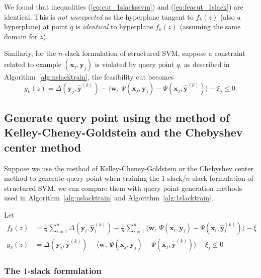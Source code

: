 {We found that inequalities (\ref{eq:cut_1slackssvm}) and (\ref{eq:feacut_1slack}) are identical.
This is \emph{not unexpected} as the hyperplane tangent to $f_k(z)$ (also a hyperplane) at point $q$ is \emph{identical} to hyperplane $f_k(z)$
(assuming the same domain for $z$). 

Similarly, for the $n$-slack formulation of structured SVM, 
suppose a constraint related to example $(\mathbf{x}_j, \mathbf{y}_j)$ is violated by query point $q$, 
as described in Algorithm~\ref{alg:nslacktrain}, the feasibility cut becomes
\begin{equation}
\label{eq:feacut_nslack}
g_k(z) = \Delta(\mathbf{y}_j, \hat{\mathbf{y}}^{(k)}) - 
\langle \mathbf{w},~ \Psi(\mathbf{x}_j, \mathbf{y}_j) - \Psi(\mathbf{x}_j, \hat{\mathbf{y}}^{(k)}) \rangle - \xi_j \le 0.
\end{equation}
}


\subsection{Generate query point using the method of Kelley-Cheney-Goldstein and the Chebyshev center method}
\label{sec:compare}

Suppose we use the method of Kelley-Cheney-Goldstein or the Chebyshev center method to generate query point 
when training the $1$-slack/$n$-slack formulation of structured SVM,
we can compare them with query point generation methods used in Algorithm~\ref{alg:nslacktrain} and Algorithm~\ref{alg:1slacktrain}.

Let 
\begin{align}
f_k(z) &= \frac{1}{n} \sum_{i=1}^n \Delta(\mathbf{y}_i, \hat{\mathbf{y}}_i^{(k)}) - 
          \frac{1}{n} \sum_{i=1}^n \langle \mathbf{w},~ \Psi(\mathbf{x}_i, \mathbf{y}_i) - \Psi(\mathbf{x}_i, \hat{\mathbf{y}}_i^{(k)}) \rangle - \xi
          \label{eq:constraint_k} \\
g_k(z) &= \Delta(\mathbf{y}_j, \hat{\mathbf{y}}^{(k)}) - 
          \langle \mathbf{w},~ \Psi(\mathbf{x}_j, \mathbf{y}_j) - \Psi(\mathbf{x}_j, \hat{\mathbf{y}}^{(k)}) \rangle - \xi_j \le 0 
          \label{eq:feacut_nslack}
\end{align}



\subsubsection{The $1$-slack formulation}
\label{sec:compare_1slack}


